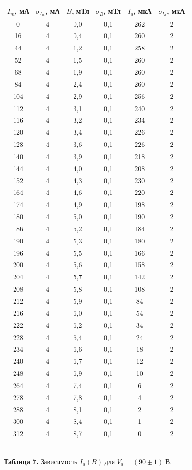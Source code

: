 \documentclass{article}
\begin{document}
\begin{center}
\begin{tabular}{|c|c|c|c|c|c|}
\hline
$I_m$, мА & $\sigma_{I_m}$, мА & $B$, мТл & $\sigma_B$, мТл & $I_a$, мкА & $\sigma_{I_a}$, мкА \\ \hline
0 & 4 & 0,0 & 0,1 & 262 & 2 \\ \hline
16 & 4 & 0,4 & 0,1 & 260 & 2 \\ \hline
44 & 4 & 1,2 & 0,1 & 258 & 2 \\ \hline
52 & 4 & 1,5 & 0,1 & 260 & 2 \\ \hline
68 & 4 & 1,9 & 0,1 & 260 & 2 \\ \hline
84 & 4 & 2,4 & 0,1 & 260 & 2 \\ \hline
104 & 4 & 2,9 & 0,1 & 256 & 2 \\ \hline
112 & 4 & 3,1 & 0,1 & 240 & 2 \\ \hline
116 & 4 & 3,2 & 0,1 & 234 & 2 \\ \hline
120 & 4 & 3,4 & 0,1 & 226 & 2 \\ \hline
128 & 4 & 3,6 & 0,1 & 226 & 2 \\ \hline
140 & 4 & 3,9 & 0,1 & 218 & 2 \\ \hline
144 & 4 & 4,0 & 0,1 & 208 & 2 \\ \hline
152 & 4 & 4,3 & 0,1 & 230 & 2 \\ \hline
164 & 4 & 4,6 & 0,1 & 220 & 2 \\ \hline
174 & 4 & 4,9 & 0,1 & 198 & 2 \\ \hline
180 & 4 & 5,0 & 0,1 & 190 & 2 \\ \hline
186 & 4 & 5,2 & 0,1 & 184 & 2 \\ \hline
190 & 4 & 5,3 & 0,1 & 180 & 2 \\ \hline
196 & 4 & 5,5 & 0,1 & 166 & 2 \\ \hline
200 & 4 & 5,6 & 0,1 & 158 & 2 \\ \hline
204 & 4 & 5,7 & 0,1 & 142 & 2 \\ \hline
208 & 4 & 5,8 & 0,1 & 108 & 2 \\ \hline
212 & 4 & 5,9 & 0,1 & 84 & 2 \\ \hline
216 & 4 & 6,0 & 0,1 & 54 & 2 \\ \hline
222 & 4 & 6,2 & 0,1 & 34 & 2 \\ \hline
228 & 4 & 6,4 & 0,1 & 24 & 2 \\ \hline
234 & 4 & 6,6 & 0,1 & 18 & 2 \\ \hline
240 & 4 & 6,7 & 0,1 & 12 & 2 \\ \hline
248 & 4 & 6,9 & 0,1 & 10 & 2 \\ \hline
264 & 4 & 7,4 & 0,1 & 6 & 2 \\ \hline
278 & 4 & 7,8 & 0,1 & 4 & 2 \\ \hline
288 & 4 & 8,1 & 0,1 & 2 & 2 \\ \hline
300 & 4 & 8,4 & 0,1 & 1 & 2 \\ \hline
312 & 4 & 8,7 & 0,1 & 0 & 2 \\ \hline
\end{tabular}\\
\textbf{Таблица 7.} Зависимость $I_a(B)$ для $V_a = (90 \pm 1)$ В.
\end{center}
\end{document}
